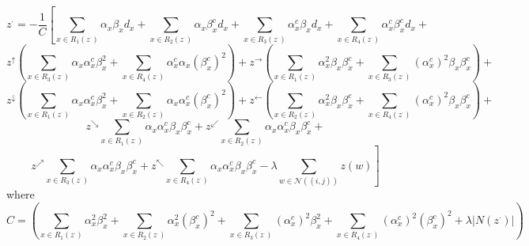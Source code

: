 \documentclass[11pt]{article}
\begin{document}
\begin{displaymath}
	z^{\cdot}=-\frac{1}{C}\left[ \sum_{x\in R_{1}(z^{\cdot})}\alpha_{x}\beta_{x}d_{x} + \sum_{x\in R_{2}(z^{\cdot})}\alpha_{x}\beta_{x}^{c}d_{x}  + \sum_{x\in R_{3}(z^{\cdot})}\alpha_{x}^{c}\beta_{x}d_{x} + \sum_{x\in 
	R_{4}(z^{\cdot})}\alpha_{x}^{c}\beta_{x}^{c}d_{x}\right.+
\end{displaymath}
\begin{displaymath}
	\left.z^{\uparrow}\left(\sum_{x\in R_{3}(z^{\cdot})}\alpha_{x}\alpha_{x}^{c}\beta_{x}^{2} + \sum_{x\in R_{4}(z^{\cdot})}\alpha_{x}^{c}\alpha_{x}(\beta_{x}^{c})^{2}\right)+z^{\rightarrow}\left(\sum_{x\in R_{1}(z^{\cdot})}\alpha_{x}^{2}\beta_{x}\beta_{x}^{c} + \sum_{x\in R_{3}(z^{\cdot})}(\alpha_{x}^{c})^{2}\beta_{x}\beta_{x}^{c}\right)+\right.
\end{displaymath}
\begin{displaymath}
	\left.z^{\downarrow}\left(\sum_{x\in R_{1}(z^{\cdot})}\alpha_{x}\alpha_{x}^{c}\beta_{x}^{2} + \sum_{x\in R_{2}(z^{\cdot})}\alpha_{x}\alpha_{x}^{c}(\beta_{x}^{c})^{2}\right)+z^{\leftarrow}\left(\sum_{x\in R_{2}(z^{\cdot})}\alpha_{x}^{2}\beta_{x}\beta_{x}^{c} + \sum_{x\in R_{4}(z^{\cdot})}(\alpha_{x}^{c})^{2}\beta_{x}\beta_{x}^{c}\right)+\right.
\end{displaymath}
\begin{displaymath}
	z^{\searrow}\sum_{x\in R_{1}(z^{\cdot})}\alpha_{x}\alpha_{x}^{c}\beta_{x}\beta_{x}^{c}+ z^{\swarrow}\sum_{x\in R_{2}(z^{\cdot})}\alpha_{x}\alpha_{x}^{c}\beta_{x}\beta_{x}^{c}+
\end{displaymath}
\begin{displaymath}
	\left.z^{\nearrow}\sum_{x\in R_{3}(z^{\cdot})}\alpha_{x}\alpha_{x}^{c}\beta_{x}\beta_{x}^{c}+ z^{\nwarrow}\sum_{x\in R_{4}(z^{\cdot})}\alpha_{x}\alpha_{x}^{c}\beta_{x}\beta_{x}^{c} - \lambda \sum_{w\in\mathcal{N}((i,j))}z(w)\right]
\end{displaymath}
where
\begin{displaymath}
    C=\left( \sum_{x \in R_{1}(z^{\cdot})}\alpha_{x}^{2}\beta_{x}^{2}+\sum_{x \in R_{2}(z^{\cdot})}\alpha_{x}^{2}(\beta_{x}^{c})^{2}+\sum_{x \in R_{3}(z^{\cdot})}(\alpha_{x}^{c})^{2}\beta_{x}^{2} +\sum_{x \in R_{4}(z^{\cdot})}(\alpha_{x}^{c})^{2}(\beta_{x}^{c})^{2} + \lambda|N(z^{\cdot})|\right)
\end{displaymath}
\end{document}
